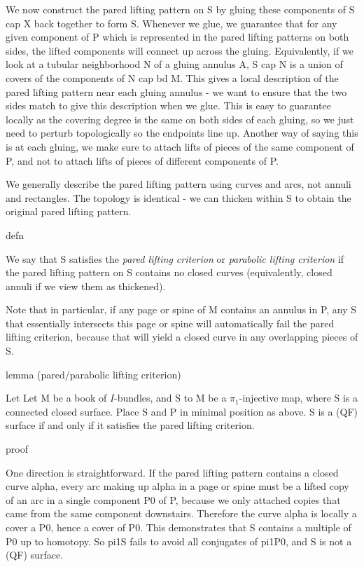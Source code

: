 We now construct the pared lifting pattern on S by gluing these components of
S cap X back together to form S. Whenever we glue, we guarantee that for any
given component of P which is represented in the pared lifting patterns on both
sides, the lifted components will connect up across the gluing.  Equivalently,
if we look at a tubular neighborhood N of a gluing annulus A, S cap N is
a union of covers of the components of N cap bd M. This gives a local
description of the pared lifting pattern near each gluing annulus - we want to
ensure that the two sides match to give this description when we glue. This is
easy to guarantee locally as the covering degree is the same on both sides of
each gluing, so we just need to perturb topologically so the endpoints line up.
Another way of saying this is at each gluing, we make sure to attach lifts of
pieces of the same component of P, and not to attach lifts of pieces of
different components of P.

We generally describe the pared lifting pattern using curves and arcs, not
annuli and rectangles. The topology is identical - we can thicken within S to
obtain the original pared lifting pattern.

defn

We say that S satisfies the \emph{pared lifting criterion} or \emph{parabolic
lifting criterion} if the pared lifting pattern on S contains no closed curves
(equivalently, closed annuli if we view them as thickened).

Note that in particular, if any page or spine of M contains an annulus in P,
any S that essentially intersects this page or spine will automatically fail
the pared lifting criterion, because that will yield a closed curve in any
overlapping pieces of S.

lemma (pared/parabolic lifting criterion)

Let Let M be a book of $I$-bundles, and S to M be a $\pi_1$-injective map, where S is
a connected closed surface.  Place S and P in minimal position as above. S is
a (QF) surface if and only if it satisfies the pared lifting criterion.

proof

One direction is straightforward. If the pared lifting pattern contains
a closed curve alpha, every arc making up alpha in a page or spine must be
a lifted copy of an arc in a single component P0 of P, because we only attached
copies that came from the same component downstairs. Therefore the curve alpha
is locally a cover a P0, hence a cover of P0. This demonstrates that S contains
a multiple of P0 up to homotopy. So pi1S fails to avoid all conjugates of
pi1P0, and S is not a (QF) surface.


